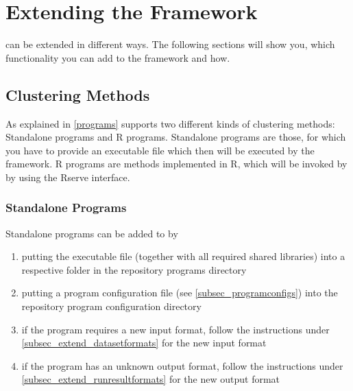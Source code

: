 
	\section{Extending the Framework}\label{sec_extend}
	\clusteval can be extended in different ways. The following sections will show you, which functionality you can add to the framework and how.
	\subsection{Clustering Methods}\label{subsec_extend_programs}
	As explained in \ref{programs} \clusteval supports two different kinds of clustering methods: Standalone programs and R programs. Standalone programs are those, for which you have to provide an executable file which then will be executed by the framework. R programs are methods implemented in R, which will be invoked by \clusteval by using the Rserve interface.
	\subsubsection{Standalone Programs}\label{subsubsec_extend_standprograms}
	Standalone programs can be added to \clusteval by
	\begin{enumerate}
		\item putting the executable file (together with all required shared libraries) into a respective folder in the repository programs directory
		
\highlight{\repoprogramexec}
		\item putting a program configuration file (see \ref{subsec_programconfigs}) into the repository program configuration directory
		
\highlight{\repoprogramconfigs}
		\item if the program requires a new input format, follow the instructions under \ref{subsec_extend_datasetformats} for the new input format
		\item if the program has an unknown output format, follow the instructions under \ref{subsec_extend_runresultformats} for the new output format
	\end{enumerate}
